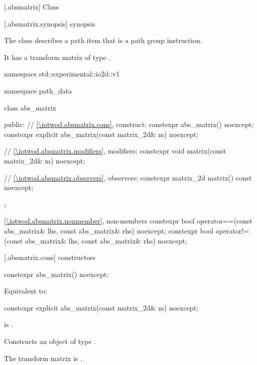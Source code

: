  [\iotwod.absmatrix] {Class }%

 [\iotwod.absmatrix.synopsis] { synopsis}%

\pnum
{}%
The class  describes a path item that is a path group instruction.

\pnum
It has a transform matrix of type .

\begin{codeblock}
namespace std::experimental::io2d::v1 {
  namespace path_data {
    class abs_matrix {
    public:
      // \ref{\iotwod.absmatrix.cons}, construct:
      constexpr abs_matrix() noexcept;
      constexpr explicit abs_matrix(const matrix_2d& m) noexcept;

      // \ref{\iotwod.absmatrix.modifiers}, modifiers:
      constexpr void matrix(const matrix_2d& m) noexcept;

      // \ref{\iotwod.absmatrix.observers}, observers:
      constexpr matrix_2d matrix() const noexcept;
    };
    
    \ref{\iotwod.absmatrix.nonmember}, non-members
    constexpr bool operator==(const abs_matrix& lhs, const abs_matrix& rhs) 
      noexcept;
    constexpr bool operator!=(const abs_matrix& lhs, const abs_matrix& rhs) 
      noexcept;
  }
}
\end{codeblock}

 [\iotwod.absmatrix.cons] { constructors}

%
\begin{itemdecl}
constexpr abs_matrix() noexcept;
\end{itemdecl}
\begin{itemdescr}
\pnum
\effects
Equivalent to: 
\end{itemdescr}

%
\begin{itemdecl}
constexpr explicit abs_matrix(const matrix_2d& m) noexcept;
\end{itemdecl}
\begin{itemdescr}
\pnum
\requires
{} is .

\pnum
\effects
Constructs an object of type .

\pnum
The transform matrix is .
\end{itemdescr}

